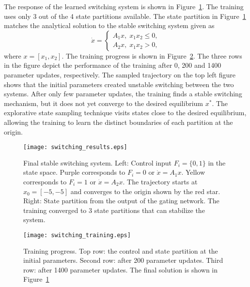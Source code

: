 %
The response of the learned switching system is shown in
Figure~\ref{fig:final_switching}.
%
The training uses only 3 out of the 4 state partitions available.
%
The state partition in Figure~\ref{fig:final_switching} matches the analytical
solution to the stable switching system given as~\cite{liberzon2003switching}
\begin{equation*}
    \dot{x} = \begin{cases}
        A_1x, \; x_1x_2 \leq 0, \\
        A_2x, \; x_1x_2 > 0,
    \end{cases}
\end{equation*}
\noindent where $x=[x_1, x_2]$.
%
The training progress is shown in Figure~\ref{fig:switching_training}.
%
The three rows in the figure depict the performance of the training after 0, 200
and 1400 parameter updates, respectively.
%
The sampled trajectory on the top left figure shows that the initial parameters
created unstable switching between the two systems.
%
After only few parameter updates, the training finds a stable switching
mechanism, but it does not yet converge to the desired equilibrium $x^*$.
%
The explorative state sampling technique visits states close to the desired
equilibrium, allowing the training to learn the distinct boundaries of each
partition at the origin. 
\begin{figure}[H]
    \centering
    \texttt{[image: switching\_results.eps]}
    \caption{Final stable switching system. Left: Control input $F_i=\{0, 1\}$ in
    the state space. Purple corresponds to $F_i=0$ or $\dot{x} = A_1x$. Yellow
    corresponds to $F_i=1$ or $\dot{x} = A_2x$. The trajectory starts at $x_0=[-5,
    -5]$ and converges to the origin shown by the red star. Right: State
    partition from the output of the gating network. The training converged to 3
    state partitions that can stabilize the system.}
    \label{fig:final_switching}
\end{figure}
\begin{figure}[H]
    \centering
    \texttt{[image: switching\_training.eps]}
    \caption{Training progress. Top row: the control and state partition at the
    initial parameters. Second row: after 200 parameter updates. Third row:
    after 1400 parameter updates. The final solution is shown in
    Figure~\ref{fig:final_switching}}
    \label{fig:switching_training}
\end{figure} 

